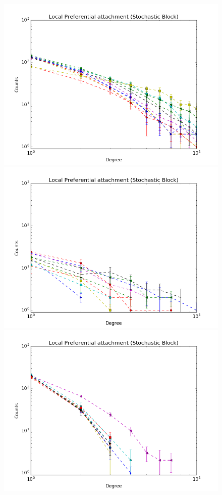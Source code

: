 \documentclass[a4paper, 12pt]{article}
\begin{document}
\begin{figure}[ht]
	\endminipage
		\vspace{-0.29cm}
	\includegraphics[scale=0.27]{img/expe/4_mmsb/figure_2}
	\endminipage
	\includegraphics[scale=0.27]{img/expe/5_mmsb/figure_2} 
	\endminipage
	\includegraphics[scale=0.27]{img/expe/6_mmsb/figure_2}

\end{figure}
\end{document}

